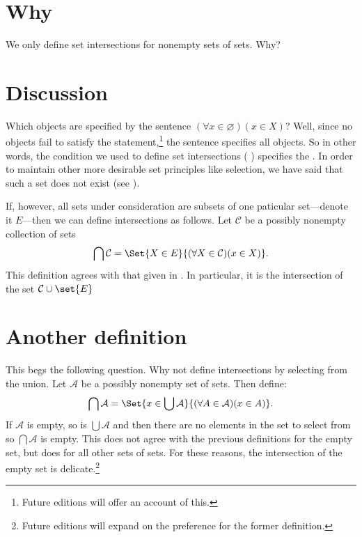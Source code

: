 

\section*{Why}

We only define set intersections for nonempty sets of sets.
Why?

\section*{Discussion}

Which objects are specified by the sentence $(\forall x \in \varnothing)(x \in X)$?
Well, since no objects fail to satisfy the statement,\footnote{Future editions will offer an account of this.}
the sentence specifies all objects.
So in other words, the condition we used to define set intersections ( ) specifies the .
In order to maintain other more desirable set principles like selection, we have said that such a set does not exist (see ).

If, however, all sets under consideration are subsets of one paticular set---denote it $E$---then we can define intersections as follows.
Let $\mathcal{C} $ be a possibly nonempty collection of sets
    \[
\bigcap \mathcal{C}  = \Set{X \in E}{(\forall X \in \mathcal{C} )(x \in X)}.
    \]
This definition agrees with that given in .
In particular, it is the intersection of the set $\mathcal{C} \cup \set{E}$

\section*{Another definition}

This begs the following question.
Why not define intersections by selecting from the union.
Let $\mathcal{A} $ be a possibly nonempty set of sets.
Then define:
    \[
\bigcap \mathcal{A}  = \Set{x \in \bigcup \mathcal{A} }{(\forall A \in \mathcal{A} )(x \in A)}.
    \]
If $\mathcal{A} $ is empty, so is $\bigcup \mathcal{A} $ and then there are no elements in the set to select from so $\bigcap \mathcal{A} $ is empty.
This does not agree with the previous definitions for the empty set, but does for all other sets of sets.
For these reasons, the intersection of the empty set is delicate.\footnote{Future editions will expand on the preference for the former definition.}


